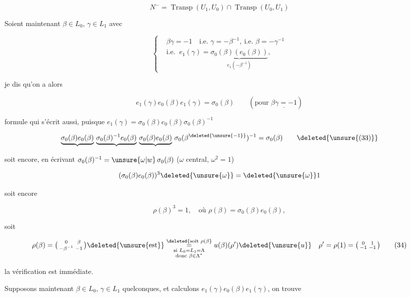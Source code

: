 
\[
 N^-=\operatorname{Transp}(U_1,U_0)\cap\operatorname{Transp}(U_0,U_1)\tag*{(30)}
\]

Soient maintenant $\beta\in L_0$, $\gamma\in L_1$ avec

\[
\left\{\begin{aligned}
 &\beta\gamma=-1\quad\text{i.e. }\gamma=-\beta^{-1},\ \text{i.e. }\beta=-\gamma^{-1}\\
 &\text{i.e. }\ e_1(\gamma)=\underbrace{\sigma_0(\beta)(e_0(\beta))}_{e_1(-\beta^{-1})},
\end{aligned}\right.\tag*{(31)}
\]

je dis qu'on a alors

\[
 e_1(\gamma)e_0(\beta)e_1(\gamma)=\sigma_0(\beta)\qquad(\text{pour }\underline{\beta\gamma=-1})\tag*{(32)}
\]

formule qui s'écrit aussi, puisque $e_1(\gamma)=\sigma_0(\beta)e_0(\beta)\sigma_0(\beta)^{-1}$

\[
 \underbrace{\sigma_0(\beta)e_0(\beta)}\,\underbrace{\sigma_0(\beta)^{-1}e_0(\beta)}\,\underbrace{\sigma_0(\beta)e_0(\beta)}\,\sigma_0(\beta^{\deleted{\unsure{-1}}})^{-1}=\sigma_0(\beta)
 \tag*{\deleted{\unsure{(33)}}}
\]

soit encore, en écrivant $\sigma_0(\beta)^{-1}=\unsure{\omega|w}\,\sigma_0(\beta)$ ($\omega$ central, $\omega^2=1$)

\[
 (\sigma_0(\beta)e_0(\beta))^3\deleted{\unsure{\omega}}=\deleted{\unsure{\omega}}1
\]

soit encore

\[
 \rho(\beta)^3=1,\quad\text{où }\rho(\beta)=\sigma_0(\beta)e_0(\beta),\tag*{(33)}
\]

soit

\[
 \rho(\beta)=\bigl(\begin{smallmatrix}0&\beta\\-\beta^{-1}&-1\end{smallmatrix}\bigr)\deleted{\unsure{\text{est}}}
 \overset{\deleted{\text{soit }\rho(\beta}}{\underset{\substack{\text{si }L_0=L_1=\Lambda\\\text{donc }\beta\in\Lambda^*}}{=}}
 u(\beta)(\rho')\deleted{\unsure{u}}\quad\rho'=\rho(1)=\bigl(\begin{smallmatrix}0&1\\-1&-1\end{smallmatrix}\bigr)\tag*{(34)}
\]

la vérification est immédiate.

Supposons maintenant $\beta\in L_0$, $\gamma\in L_1$ quelconques, et calculons $e_1(\gamma)e_0(\beta)e_1(\gamma)$, on trouve


